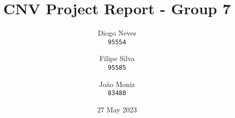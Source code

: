 \documentclass{article}
\date{27 May 2023}
\title{CNV Project Report - Group 7}
\author{
    Diogo Neves \\
    \texttt{95554}
    \and
    Filipe Silva \\
    \texttt{95585}
    \and
    João Moniz \\
    \texttt{83480}
}
\begin{document}
\maketitle

\twocolumn

\lipsum
\end{document}
